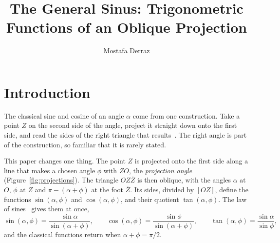 \documentclass[11pt]{amsart}
\theoremstyle{definition}
\theoremstyle{remark}
\numberwithin{equation}{section}
\begin{document}
\title{The General Sinus: Trigonometric Functions of an Oblique Projection}
\author{Mostafa Derraz}
\address{Independent Researcher, Tangier, Morocco}


\maketitle


\section{Introduction}
\label{sec:introduction}

The classical sine and cosine of an angle $\alpha$ come from one
construction. Take a point $Z$ on the second side of the angle,
project it straight down onto the first side, and read the sides of the
right triangle that results~\cite{Maor1998}. The right angle is part of
the construction, so familiar that it is rarely stated.

This paper changes one thing. The point $Z$ is projected onto the first
side along a line that makes a chosen angle $\phi$ with $ZO$, the
\emph{projection angle} (Figure~\ref{fig:projections}). The triangle
$OZ\overline{Z}$ is then oblique, with the angles $\alpha$ at $O$,
$\phi$ at $Z$ and $\pi-(\alpha+\phi)$ at the foot $\overline{Z}$. Its
sides, divided by $[OZ]$, define the functions $\sin(\alpha,\phi)$ and
$\cos(\alpha,\phi)$, and their quotient $\tan(\alpha,\phi)$. The law of
sines~\cite{CoxeterGreitzer1967} gives them at once,
\[
\sin(\alpha,\phi) = \frac{\sin\alpha}{\sin(\alpha+\phi)}, \qquad
\cos(\alpha,\phi) = \frac{\sin\phi}{\sin(\alpha+\phi)}, \qquad
\tan(\alpha,\phi) = \frac{\sin\alpha}{\sin\phi},
\]
and the classical functions return when $\alpha+\phi = \pi/2$.
\end{document}
